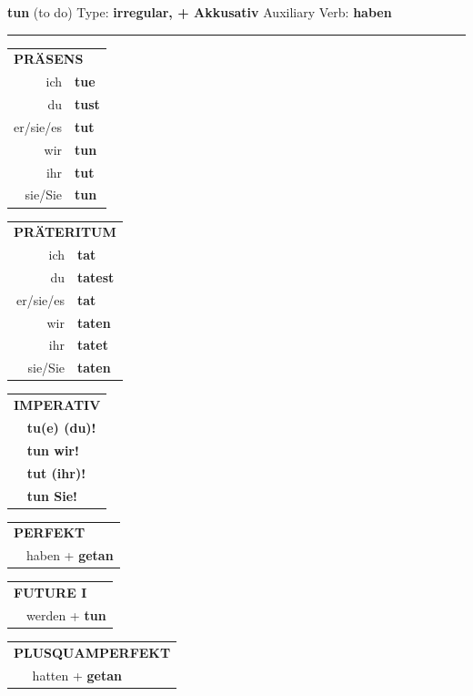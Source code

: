 \documentclass[10pt,a4paper]{revtex4-2}
\begin{document}
\begin{verbbox-acc}
{\Large \bf tun} (to do) \hfill Type: \textbf{irregular, + Akkusativ} \hfill Auxiliary Verb: \textbf{haben}

\vspace{5pt}
\hrule
\vspace{5pt}

\begin{tabular}{rl}
\multicolumn{2}{l}{\textbf{PRÄSENS}}\\
ich & \textbf{tue}\\
du & \textbf{tust}\\
er/sie/es & \textbf{tut}\\
wir & \textbf{tun}\\
ihr & \textbf{tut}\\
sie/Sie & \textbf{tun}\\
\end{tabular}
\hfill
\begin{tabular}{rl}
\multicolumn{2}{l}{\textbf{PRÄTERITUM}}\\
ich & \textbf{tat}\\
du & \textbf{tatest}\\
er/sie/es & \textbf{tat}\\
wir & \textbf{taten}\\
ihr & \textbf{tatet}\\
sie/Sie & \textbf{taten}\\
\end{tabular}
\hfill
\begin{tabular}{rl}
\multicolumn{2}{l}{\textbf{IMPERATIV}}\\
& \textbf{tu(e) (du)!}\\
& \textbf{tun wir!}\\
& \textbf{tut (ihr)!}\\
& \textbf{tun Sie!}\\
\end{tabular}

\vspace{10pt}

\begin{tabular}{rl}
\multicolumn{2}{l}{\textbf{PERFEKT}}\\
& haben + \textbf{getan}\\
\end{tabular}
\hfill
\begin{tabular}{rl}
\multicolumn{2}{l}{\textbf{FUTURE I}}\\
& werden + \textbf{tun}\\
\end{tabular}
\hfill
\begin{tabular}{rl}
\multicolumn{2}{l}{\textbf{PLUSQUAMPERFEKT}}\\
& hatten + \textbf{getan}\\
\end{tabular}


\end{verbbox-acc}
\end{document}
